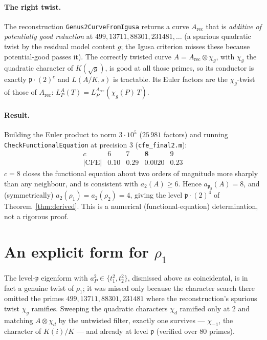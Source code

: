 \documentclass[11pt]{article}
\begin{document}
\paragraph{The right twist.} The reconstruction \texttt{Genus2CurveFromIgusa} returns a curve
$A_{\mathrm{rec}}$ that is \emph{additive of potentially good reduction} at
$499,13711,88301,231481,\dots$ (a spurious quadratic twist by the residual model content $g$;
the Igusa criterion misses these because potential-good passes it). The correctly twisted curve
$A=A_{\mathrm{rec}}\otimes\chi_g$, with $\chi_g$ the quadratic character of $K(\sqrt g)$, is good
at all those primes, so its conductor is exactly $\mathfrak p\cdot(2)^{c}$ and $L(A/K,s)$ is
tractable. Its Euler factors are the $\chi_g$-twist of those of $A_{\mathrm{rec}}$:
$L^{A}_P(T)=L^{A_{\mathrm{rec}}}_P(\chi_g(P)\,T)$.

\paragraph{Result.} Building the Euler product to norm $3\cdot10^{5}$ ($25\,981$ factors) and
running \texttt{CheckFunctionalEquation} at precision $3$ (\texttt{cfe\_final2.m}):
\[
\begin{array}{c|cccc}
c & 6 & 7 & \mathbf{8} & 9\\\hline
|\mathrm{CFE}| & 0.10 & 0.29 & \mathbf{0.0020} & 0.23
\end{array}
\]
$c=8$ closes the functional equation about two orders of magnitude more sharply than any
neighbour, and is consistent with $a_2(A)\ge 6$. Hence $a_{\mathfrak p_2}(A)=8$, and
(symmetrically) $a_2(\rho_1)=a_2(\rho_2)=4$, giving the level $\mathfrak p\cdot(2)^4$ of
Theorem~\ref{thm:derived}. This is a numerical (functional-equation) determination, not a
rigorous proof.

\section{An explicit form for $\rho_1$}\label{sec:explicit}

The level-$\mathfrak p$ eigenform with $a_P^2\in\{t_1^2,t_2^2\}$, dismissed above as coincidental,
is in fact a genuine twist of $\rho_1$; it was missed only because the character search there
omitted the primes $499,13711,88301,231481$ where the reconstruction's spurious twist $\chi_g$
ramifies. Sweeping the quadratic characters $\chi_d$ ramified only at $2$ and matching
$A\otimes\chi_d$ by the untwisted filter, exactly one survives --- $\chi_{-1}$, the character of
$K(i)/K$ --- and already at level $\mathfrak p$ (verified over $80$ primes).
\end{document}
